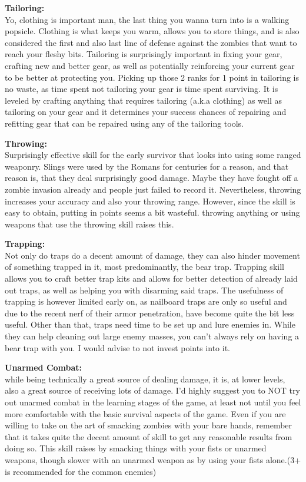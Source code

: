 \textbf{Tailoring:}\\Yo, clothing is important man, the last thing you wanna turn into is a walking popsicle. Clothing is what keeps you warm, allows you to store things, and is also considered the first and also last line of defense against the zombies that want to reach your fleshy bits. Tailoring is surprisingly important in fixing your gear, crafting new and better gear, as well as potentially reinforcing your current gear to be better at protecting you. Picking up those 2 ranks for 1 point in tailoring is no waste, as time spent not tailoring your gear is time spent surviving. It is leveled by crafting anything that requires tailoring (a.k.a clothing) as well as tailoring on your gear and it determines your success chances of repairing and refitting gear that can be repaired using any of the tailoring tools.

\textbf{Throwing:}\\Surprisingly effective skill for the early survivor that looks into using some ranged weaponry. Slings were used by the Romans for centuries for a reason, and that reason is, that they deal surprisingly good damage. Maybe they have fought off a zombie invasion already and people just failed to record it. Nevertheless, throwing increases your accuracy and also your throwing range. However, since the skill is easy to obtain, putting in points seems a bit wasteful. throwing anything or using weapons that use the throwing skill raises this.

\textbf{Trapping:}\\Not only do traps do a decent amount of damage, they can also hinder movement of something trapped in it, most predominantly, the bear trap. Trapping skill allows you to craft better trap kits and allows for better detection of already laid out traps, as well as helping you with disarming said traps. The usefulness of trapping is however limited early on, as nailboard traps are only so useful and due to the recent nerf of their armor penetration, have become quite the bit less useful. Other than that, traps need time to be set up and lure enemies in. While they can help cleaning out large enemy masses, you can't always rely on having a bear trap with you. I would advise to not invest points into it.

\textbf{Unarmed Combat:}\\while being technically a great source of dealing damage, it is, at lower levels, also a great source of receiving lots of damage. I'd highly suggest you to NOT try out unarmed combat in the learning stages of the game, at least not until you feel more comfortable with the basic survival aspects of the game. Even if you are willing to take on the art of smacking zombies with your bare hands, remember that it takes quite the decent amount of skill to get any reasonable results from doing so. This skill raises by smacking things with your fists or unarmed weapons, though slower with an unarmed weapon as by using your fists alone.(3+ is recommended for the common enemies)

